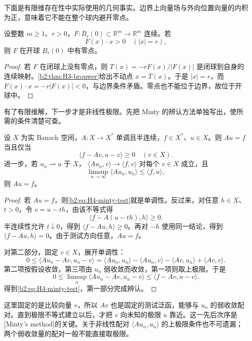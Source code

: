 下面是有限维存在性中实际使用的几何事实。边界上向量场与外向位置向量的内积为正，意味着它不能在整个球内避开零点。

\begin{lemma}[有限维外向条件给出零点]\label{b2:lem:H4-outward-zero}
设整数 \(m\ge1\)、\(r>0\)，\(F:\overline B_r(0)\subset\mathbb R^m\to\mathbb R^m\) 连续。若
\[
 F(x)\cdot x>0\quad(|x|=r),
\]
则 \(F\) 在开球 \(B_r(0)\) 中有零点。
\end{lemma}
\begin{proof}
若 \(F\) 在闭球上没有零点，则
\(T(x)=-rF(x)/|F(x)|\)
是闭球到自身的连续映射。\cref{b2:thm:H3-brouwer}给出不动点 \(x=T(x)\)。于是 \(|x|=r\)，而 \(F(x)\cdot x=-r|F(x)|<0\)，与边界条件矛盾。零点也不能位于边界，故位于开球中。
\end{proof}

有了有限维解，下一步才是非线性极限。先把 Minty 的辨认方法单独写出，使所需的条件清楚可查。

\begin{lemma}[Minty 辨认]\label{b2:lem:H4-minty}
设 \(X\) 为实 Banach 空间，\(A:X\to X^*\) 单调且半连续，\(f\in X^*\)、\(u\in X\)。则 \(Au=f\) 当且仅当
\begin{equation}\label{b2:eq:H4-minty-test}
 \langle f-Av,u-v\rangle\ge0
 \quad(v\in X).
\end{equation}
进一步，若 \(u_n\rightharpoonup u\) 于 \(X\)，
\(\langle Au_n,v\rangle\to\langle f,v\rangle\) 对每个 \(v\in X\) 成立，且
\[
 \limsup_{n\to\infty}\langle Au_n,u_n\rangle
             \le\langle f,u\rangle,
\]
则 \(Au=f\)。
\end{lemma}
\begin{proof}
若 \(Au=f\)，则\eqref{b2:eq:H4-minty-test}就是单调性。反过来，对任意 \(h\in X\)、\(t>0\)，令 \(v=u-th\)，由该不等式得
\[
 \langle f-A(u-th),h\rangle\ge0.
\]
半连续性允许 \(t\downarrow0\)，得到 \(\langle f-Au,h\rangle\ge0\)。再对 \(-h\) 使用同一结论，得到 \(\langle f-Au,h\rangle=0\)。由于测试方向任意，\(Au=f\)。

对第二部分，固定 \(v\in X\)，展开单调性：
\[
 0\le\langle Au_n-Av,u_n-v\rangle
 =\langle Au_n,u_n\rangle-\langle Au_n,v\rangle
       -\langle Av,u_n\rangle+\langle Av,v\rangle.
\]
第二项按假设收敛，第三项由 \(u_n\) 弱收敛而收敛，第一项则取上极限。于是
\[
 0\le\limsup_n\langle Au_n-Av,u_n-v\rangle
   \le\langle f-Av,u-v\rangle.
\]
得到\eqref{b2:eq:H4-minty-test}，第一部分完成辨认。
\end{proof}

这里固定的是比较向量 \(v\)，所以 \(Av\) 也是固定的测试泛函，能够与 \(u_n\) 的弱收敛配对。直到极限不等式建立以后，才把 \(v\) 向未知的极限 \(u\) 靠近。这一先后次序是[Minty's method]的关键。关于非线性配对 \(\langle Au_n,u_n\rangle\) 的上极限条件也不可遗漏；两个弱收敛量的配对一般不能直接取极限。

